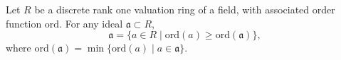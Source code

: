 Let $R$ be a discrete rank one valuation ring of a field, with associated order function $\mathrm{ord}$. For any ideal $\mathfrak{a} \subset R$,
$$\mathfrak{a} = \{a \in R \mid \mathrm{ord}(a) \geq \mathrm{ord}(\mathfrak{a})\},$$
where $\mathrm{ord}(\mathfrak{a}) = \min\{\mathrm{ord}(a) \mid a \in \mathfrak{a}\}$.
